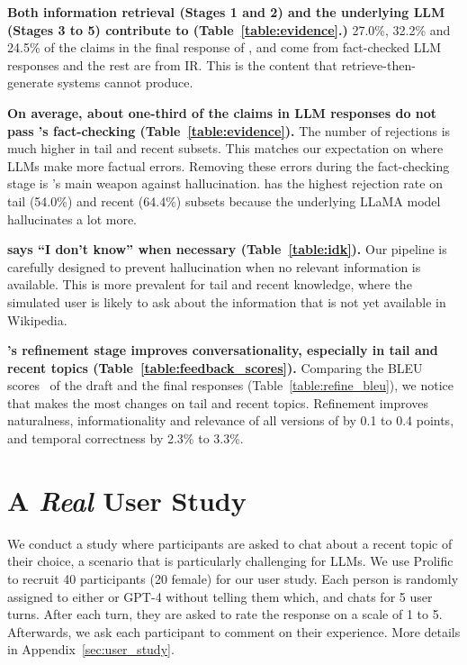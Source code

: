 {\bf Both information retrieval (Stages 1 and 2) and the underlying LLM (Stages 3 to 5) contribute to \system (Table~\ref{table:evidence}.)}
27.0\%, 32.2\% and 24.5\% of the claims in the final response of \systemgf, \systemgt and \systeml come from fact-checked LLM responses 
and the rest are from IR. This is the content that retrieve-then-generate systems cannot produce. 

{\bf On average, about one-third of the claims in LLM responses do not pass \system's fact-checking (Table~\ref{table:evidence}).} The number of rejections is much higher in tail and recent subsets. This matches our expectation on where LLMs make more factual errors. Removing these errors during the fact-checking stage is \system's main weapon against hallucination.
\systeml has the highest rejection rate on tail (54.0\%) and recent (64.4\%) subsets because the underlying LLaMA model hallucinates a lot more.

{\bf \system says ``I don't know'' when necessary (Table~\ref{table:idk}).} 
Our pipeline is carefully designed to prevent hallucination when no relevant information is available.
This is more prevalent for tail and recent knowledge, where the simulated user is likely to ask about the information that is not yet available in Wikipedia.

{\bf \system's refinement stage improves conversationality, especially in tail and recent topics (Table~\ref{table:feedback_scores}).}
Comparing the BLEU scores~\cite{papineni-etal-2002-bleu} of the draft and the final responses (Table~\ref{table:refine_bleu}), we notice that 
\system makes the most changes on tail and recent topics. Refinement improves naturalness, informationality and relevance of all versions of \system by 0.1 to 0.4 points, and temporal correctness by 2.3\% to 3.3\%.


\section{A {\em Real} User Study}
We conduct a study where participants are asked to chat about a recent topic of their choice, a scenario that is particularly challenging for LLMs. We use Prolific~\cite{prolific} to recruit 40 participants (20 female) for our user study. Each person is randomly assigned to either \systemgf or GPT-4 without telling them which, and chats for 5 user turns. After each turn, they are asked to rate the response on a scale of 1 to 5. Afterwards, we ask each participant to comment on their experience.
More details in Appendix~\ref{sec:user_study}.


